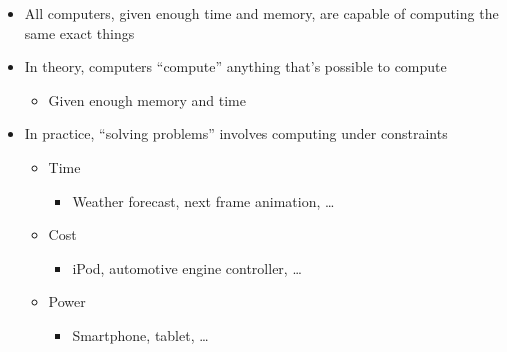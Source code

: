 \begin{itemize}
    \begin{itemize}

      \item All computers, given enough time and memory, are capable of computing the same exact things

      \item In theory, computers ``compute'' anything that's possible to compute

        \begin{itemize}

          \item Given enough memory and time

        \end{itemize}

      \item In practice, ``solving problems'' involves computing under constraints

        \begin{itemize}

          \item Time

            \begin{itemize}

              \item Weather forecast, next frame animation, \ldots

            \end{itemize}

          \item Cost

            \begin{itemize}

              \item iPod, automotive engine controller, \ldots

            \end{itemize}

          \item Power

            \begin{itemize}

              \item Smartphone, tablet, \ldots

            \end{itemize}

        \end{itemize}

    \end{itemize}


\end{itemize}
